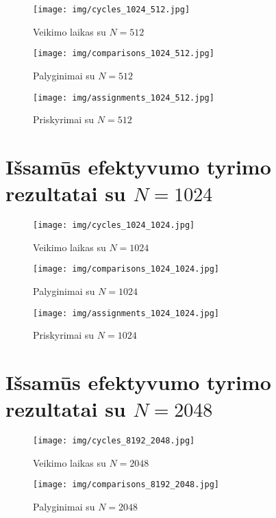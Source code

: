 \documentclass{VUMIFInfBakalaurinis}
\begin{document}
\begin{figure}[H]
  \centering
  \texttt{[image: img/cycles\_1024\_512.jpg]}
  \caption{Veikimo laikas su $N = 512$}
\end{figure}

\begin{figure}[H]
  \centering
  \texttt{[image: img/comparisons\_1024\_512.jpg]}
  \caption{Palyginimai su $N = 512$}
\end{figure}

\begin{figure}[H]
  \centering
  \texttt{[image: img/assignments\_1024\_512.jpg]}
  \caption{Priskyrimai su $N = 512$}
\end{figure}

\section{Išsamūs efektyvumo tyrimo rezultatai su $N = 1024$}

\begin{figure}[H]
  \centering
  \texttt{[image: img/cycles\_1024\_1024.jpg]}
  \caption{Veikimo laikas su $N = 1024$}
\end{figure}

\begin{figure}[H]
  \centering
  \texttt{[image: img/comparisons\_1024\_1024.jpg]}
  \caption{Palyginimai su $N = 1024$}
\end{figure}

\begin{figure}[H]
  \centering
  \texttt{[image: img/assignments\_1024\_1024.jpg]}
  \caption{Priskyrimai su $N = 1024$}
\end{figure}

\section{Išsamūs efektyvumo tyrimo rezultatai su $N = 2048$}

\begin{figure}[H]
  \centering
  \texttt{[image: img/cycles\_8192\_2048.jpg]}
  \caption{Veikimo laikas su $N = 2048$}
\end{figure}

\begin{figure}[H]
  \centering
  \texttt{[image: img/comparisons\_8192\_2048.jpg]}
  \caption{Palyginimai su $N = 2048$}
\end{figure}
\end{document}
